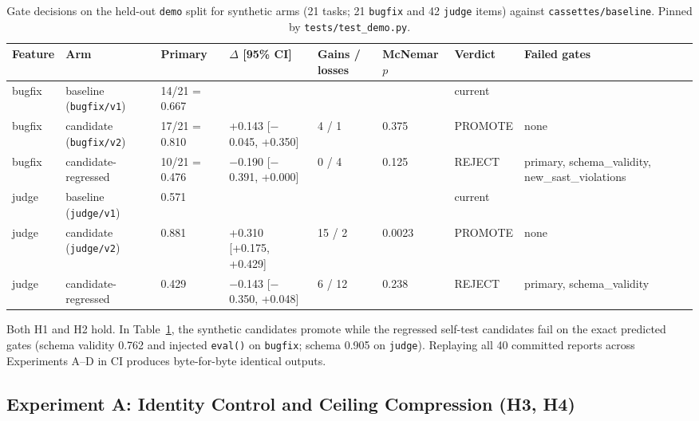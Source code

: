 \documentclass[conference]{IEEEtran}
\begin{document}
\begin{table}[!t]
\caption{Gate decisions on the held-out \texttt{demo} split for synthetic arms (21 tasks; 21 \texttt{bugfix} and 42 \texttt{judge} items) against \texttt{cassettes/\allowbreak{}baseline}. Pinned by \texttt{tests/\allowbreak{}test\_\allowbreak{}demo.\allowbreak{}py}.}
\label{tab:demo}
\centering
\scriptsize
\setlength{\tabcolsep}{3pt}
\begin{tabular}{lllllll >{\raggedright\arraybackslash}p{}}
\hline
Feature & Arm & Primary & $\Delta$ [95\% CI] & Gains / losses & McNemar $p$ & Verdict & Failed gates \\
\hline
bugfix & baseline (\texttt{bugfix/\allowbreak{}v1}) & 14/21 = 0.667 &  &  &  & current &  \\
bugfix & candidate (\texttt{bugfix/\allowbreak{}v2}) & 17/21 = 0.810 & +0.143 [$-$0.045, +0.350] & 4 / 1 & 0.375 & PROMOTE & none \\
bugfix & candidate-regressed & 10/21 = 0.476 & $-$0.190 [$-$0.391, +0.000] & 0 / 4 & 0.125 & REJECT & primary, schema\_validity, new\_sast\_violations \\
judge & baseline (\texttt{judge/\allowbreak{}v1}) & 0.571 &  &  &  & current &  \\
judge & candidate (\texttt{judge/\allowbreak{}v2}) & 0.881 & +0.310 [+0.175, +0.429] & 15 / 2 & 0.0023 & PROMOTE & none \\
judge & candidate-regressed & 0.429 & $-$0.143 [$-$0.350, +0.048] & 6 / 12 & 0.238 & REJECT & primary, schema\_validity \\
\hline
\end{tabular}
\end{table}

Both H1 and H2 hold. In Table~\ref{tab:demo}, the synthetic candidates promote while the regressed self-test candidates fail on the exact predicted gates (schema validity 0.762 and injected \texttt{eval()} on \texttt{bugfix}; schema 0.905 on \texttt{judge}). Replaying all 40 committed reports across Experiments A--D in CI produces byte-for-byte identical outputs.

\subsection{Experiment A: Identity Control and Ceiling Compression (H3, H4)}
\label{sec:results-expa}
\end{document}
